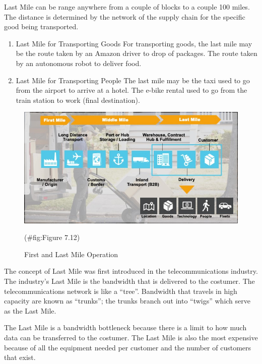 \documentclass[
]{book}
\begin{document}
Last Mile can be range anywhere from a couple of blocks to a couple 100 miles. The distance is determined by the network of the supply chain for the specific good being transported.

\begin{enumerate}
\def\labelenumi{\arabic{enumi}.}
\item
  Last Mile for Transporting Goods
  For transporting goods, the last
  mile may be the route taken by an Amazon driver to drop of packages.
  The route taken by an
  autonomous robot to deliver food.
\item
  Last Mile for Transporting People
  The last mile may be the taxi used to go
  from the airport to arrive at a hotel.
  The e-bike rental used to go from the
  train station to work (final destination).
\end{enumerate}

\begin{figure}

{\centering \includegraphics{./Images/supplychain/First and Last Mile Operation} 

}

\caption{First and Last Mile Operation}(\#fig:Figure 7.12)
\end{figure}

The concept of Last Mile was first introduced in the telecommunications industry.
The industry's Last Mile is the bandwidth that is delivered to the costumer.
The telecommunications network is like a ``tree''. Bandwidth that travels in high capacity are known as ``trunks''; the trunks branch out into ``twigs'' which serve as the Last Mile.

The Last Mile is a bandwidth bottleneck because there is a limit to how much data can be transferred to the costumer.
The Last Mile is also the most expensive because of all the equipment needed per customer and the number of customers that exist.
\end{document}
